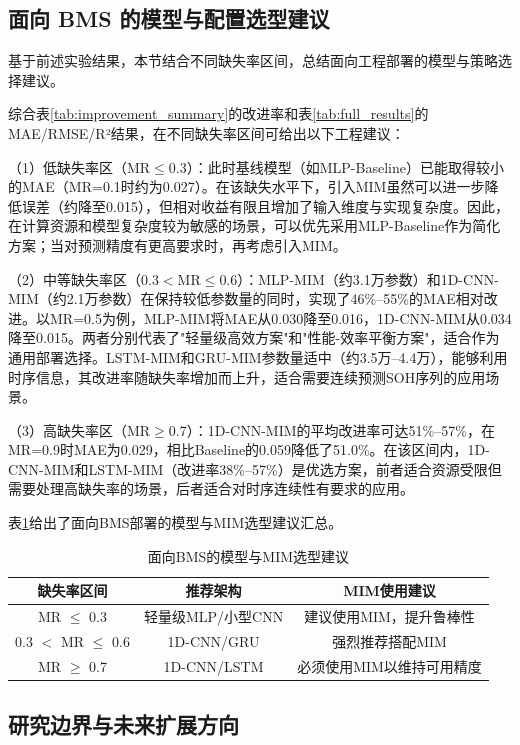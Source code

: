 \documentclass[10pt,a4paper]{ctexart}
\begin{document}
\subsection{面向 BMS 的模型与配置选型建议}

基于前述实验结果，本节结合不同缺失率区间，总结面向工程部署的模型与策略选择建议。

综合表\ref{tab:improvement_summary}的改进率和表\ref{tab:full_results}的MAE/RMSE/R²结果，在不同缺失率区间可给出以下工程建议：

（1）低缺失率区（MR$\leq$0.3）：此时基线模型（如MLP-Baseline）已能取得较小的MAE（MR=0.1时约为0.027）。在该缺失水平下，引入MIM虽然可以进一步降低误差（约降至0.015），但相对收益有限且增加了输入维度与实现复杂度。因此，在计算资源和模型复杂度较为敏感的场景，可以优先采用MLP-Baseline作为简化方案；当对预测精度有更高要求时，再考虑引入MIM。

（2）中等缺失率区（0.3$<$MR$\leq$0.6）：MLP-MIM（约3.1万参数）和1D-CNN-MIM（约2.1万参数）在保持较低参数量的同时，实现了46\%--55\%的MAE相对改进。以MR=0.5为例，MLP-MIM将MAE从0.030降至0.016，1D-CNN-MIM从0.034降至0.015。两者分别代表了"轻量级高效方案"和"性能-效率平衡方案"，适合作为通用部署选择。LSTM-MIM和GRU-MIM参数量适中（约3.5万--4.4万），能够利用时序信息，其改进率随缺失率增加而上升，适合需要连续预测SOH序列的应用场景。

（3）高缺失率区（MR$\geq$0.7）：1D-CNN-MIM的平均改进率可达51\%--57\%，在MR=0.9时MAE为0.029，相比Baseline的0.059降低了51.0\%。在该区间内，1D-CNN-MIM和LSTM-MIM（改进率38\%--57\%）是优选方案，前者适合资源受限但需要处理高缺失率的场景，后者适合对时序连续性有要求的应用。

表\ref{tab:model_selection}给出了面向BMS部署的模型与MIM选型建议汇总。

\begin{table}[H]
\centering
\caption{面向BMS的模型与MIM选型建议}
\label{tab:model_selection}
\begin{tabular}{|c|c|c|}
\hline
\textbf{缺失率区间} & \textbf{推荐架构} & \textbf{MIM使用建议} \\
\hline
MR $\leq$ 0.3 & 轻量级MLP/小型CNN & 建议使用MIM，提升鲁棒性 \\
\hline
0.3 $<$ MR $\leq$ 0.6 & 1D-CNN/GRU & 强烈推荐搭配MIM \\
\hline
MR $\geq$ 0.7 & 1D-CNN/LSTM & 必须使用MIM以维持可用精度 \\
\hline
\end{tabular}
\end{table}

\subsection{研究边界与未来扩展方向}
\end{document}
